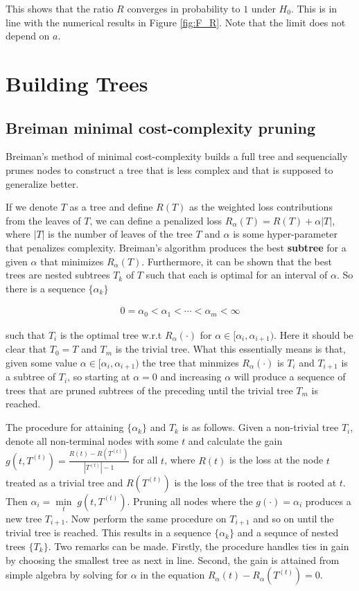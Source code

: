 \documentclass{article}
\theoremstyle{definition}
\theoremstyle{remark}
\begin{document}
This shows that the ratio $R$ converges in probability to $1$ under $H_0$. This is in line with the numerical results in Figure \ref{fig:F_R}. Note that the limit does not depend on $a$.

\section{Building Trees}

\subsection{Breiman minimal cost-complexity pruning}
\label{sec:ccp}
Breiman's method of minimal cost-complexity builds a full tree and sequencially
prunes nodes to construct a tree that is less complex and that is supposed to
generalize better. 

If we denote $ T $ as a tree and define $ R(T) $ as the
weighted loss contributions from the leaves of $ T $, we can define a penalized
loss $ R_{\alpha}(T) = R(T) + \alpha|T|$, where $ |T| $ is the number of leaves
of the tree $ T $ and $ \alpha $ is some hyper-parameter that penalizes
complexity. Breiman's algorithm produces the best \textbf{subtree} for a given $ \alpha $ that minimizes
$ R_{\alpha}(T) $. Furthermore, it can be shown that the best trees are nested 
subtrees $ T_k $ of $ T $ such that each is optimal for an interval of $ \alpha
$. So there is a sequence $ \{\alpha_k \} $ 

\begin{align}
 0 = \alpha_0 < \alpha_1 < \cdots < \alpha_m < \infty 
\end{align}

such that $ T_i $ is the optimal  tree w.r.t $ R_{\alpha}(\cdot) $ for $ \alpha \in [\alpha_i,
\alpha_{i+1}) $. Here it should be clear that $ T_0 = T $ and $ T_m $ is the
trivial tree. What this essentially means is that, given some value $ \alpha \in [\alpha_i,
\alpha_{i+1}) $ the tree that minmizes $ R_{\alpha}(\cdot) $ is $ T_i $ and $ T_{i+1} $ is a subtree of $
T_i $, so starting at $ \alpha = 0 $ and increasing $ \alpha $ will produce a
sequence of trees that are pruned subtrees of the preceding until the trivial tree
$ T_m $ is reached.

The procedure for attaining $ \{\alpha_k \} $ and $ T_k $ is as follows. Given a non-trivial
tree $ T_i $, denote all non-terminal nodes with some $ t $ and calculate the 
gain $ g(t, T^{(t)}) = \frac{R(t) - R(T^{(t)})}{|T^{(t)}| - 1} $ for all $ t $, where $ R(t) $ is
the loss at the node $ t $ treated as a trivial tree and $ R(T^{(t)}) $ is the
loss of the tree that is rooted at $ t $. Then $\alpha_i = \underset{t}\min \; 
g(t,T^{(t)})$. Pruning all nodes where the $ g(\cdot) = \alpha_i $ produces a new
tree $ T_{i+1} $. Now perform the same procedure on $ T_{i+1} $ and so on until
the trivial tree is reached. This results in a sequence $ \{\alpha_k \} $ and a
sequnce of nested trees $ \{ T_k \} $. Two remarks can be made. Firstly, the procedure
handles ties in gain by choosing the smallest tree as next in line. Second, the
gain is attained from simple algebra by solving for $ \alpha $ in the equation
$R_{\alpha}(t) - R_{\alpha}(T^{(t)}) = 0 $.
\end{document}
